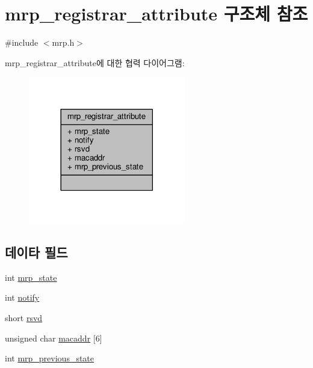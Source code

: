 \hypertarget{structmrp__registrar__attribute}{}\section{mrp\+\_\+registrar\+\_\+attribute 구조체 참조}
\label{structmrp__registrar__attribute}


{\ttfamily \#include $<$mrp.\+h$>$}



mrp\+\_\+registrar\+\_\+attribute에 대한 협력 다이어그램\+:
\nopagebreak
\begin{figure}[H]
\begin{center}
\leavevmode
\includegraphics[width=194pt]{structmrp__registrar__attribute__coll__graph}
\end{center}
\end{figure}
\subsection*{데이타 필드}
\begin{DoxyCompactItemize}
\item 
int \hyperlink{structmrp__registrar__attribute_a81aba50506912ce81758c19f9859445e}{mrp\+\_\+state}
\item 
int \hyperlink{structmrp__registrar__attribute_a6c17ea8bcc28c91e490e1112d5348541}{notify}
\item 
short \hyperlink{structmrp__registrar__attribute_adf087f747a68e06e9381f967846e7596}{rsvd}
\item 
unsigned char \hyperlink{structmrp__registrar__attribute_a3c39313f42d97e1a0bdb140add9ff200}{macaddr} \mbox{[}6\mbox{]}
\item 
int \hyperlink{structmrp__registrar__attribute_a36519f39fcb22bd3b6b05b51d2bb7fbf}{mrp\+\_\+previous\+\_\+state}
\end{DoxyCompactItemize}


